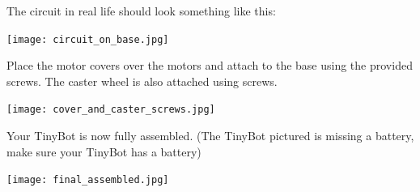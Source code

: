 \documentclass[../TinyBot.tex]{subfiles}
\begin{document}
The circuit in real life should look something like this:

\begin{center}
    \texttt{[image: circuit\_on\_base.jpg]}
\end{center}


Place the motor covers over the motors and attach to the base using the provided screws. The caster wheel is also attached using screws. 

\begin{center}
    \texttt{[image: cover\_and\_caster\_screws.jpg]}
\end{center}

Your TinyBot is now fully assembled. (The TinyBot pictured is missing a battery, make sure your TinyBot has a battery)
\begin{center}
    \texttt{[image: final\_assembled.jpg]}
\end{center}
\end{document}
